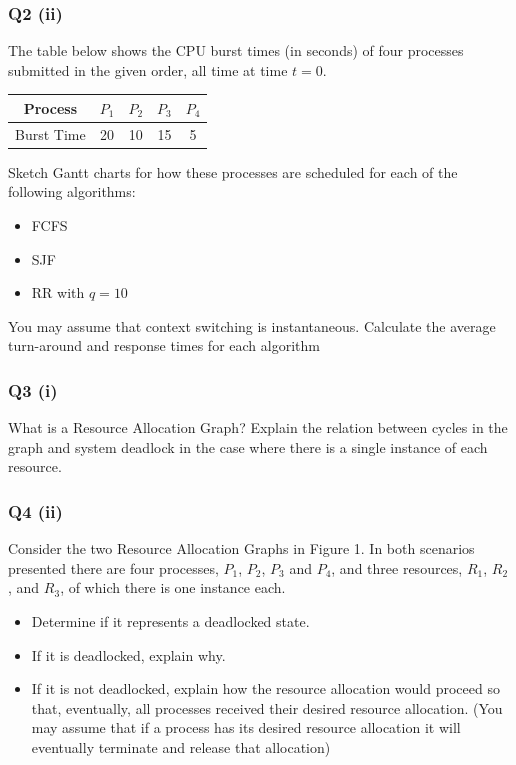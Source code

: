 \documentclass[a4paper, 10pt]{article}
\begin{document}
\subsubsection*{Q2 (ii)}
The table below shows the CPU burst times (in seconds) of four processes submitted in the given order, all time at time $t = 0$.
\begin{center}
    \begin{tabular}{c|c|c|c|c}
        Process    & $P_1$ & $P_2$ & $P_3$ & $P_4$ \\
        \hline
        Burst Time & 20    & 10    & 15    & 5     \\
    \end{tabular}
\end{center}
Sketch Gantt charts for how these processes are scheduled for each of the
following algorithms:
\begin{itemize}
    \item FCFS
    \item SJF
    \item RR with $q = 10$
\end{itemize}
You may assume that context switching is instantaneous. Calculate the average turn-around and response times for each algorithm
\subsubsection*{Q3 (i)}
What is a Resource Allocation Graph? Explain the relation between cycles in the graph and system deadlock in the case where there is a single instance of each resource.
\subsubsection*{Q4 (ii)}
Consider the two Resource Allocation Graphs in Figure 1. In both scenarios presented there are four processes, $P_1$, $P_2$, $P_3$ and $P_4$, and three resources, $R_1$, $R_2$, and $R_3$, of which there is one instance each.
\begin{itemize}
    \item Determine if it represents a deadlocked state.
    \item If it is deadlocked, explain why.
    \item If it is not deadlocked, explain how the resource allocation would
          proceed so that, eventually, all processes received their desired
          resource allocation. (You may assume that if a process has its
          desired resource allocation it will eventually terminate and release
          that allocation)
\end{itemize}
\end{document}
